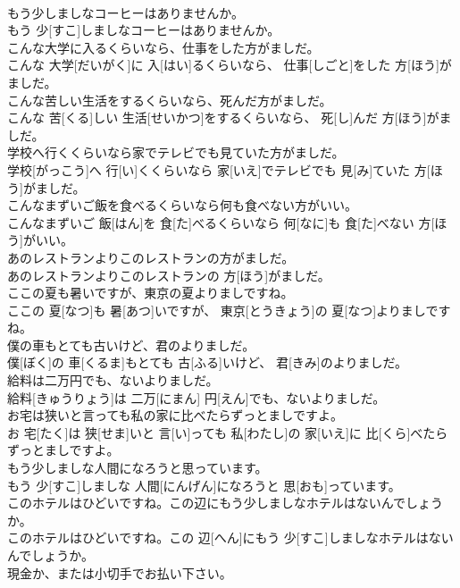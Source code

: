 \documentclass[8pt]{extreport}
\begin{document}
\begin{CJK}{UTF8}{min}
\\	もう少しましなコーヒーはありませんか。	
\\	もう 少[すこ]しましなコーヒーはありませんか。
\\	こんな大学に入るくらいなら、仕事をした方がましだ。	
\\	こんな 大学[だいがく]に 入[はい]るくらいなら、 仕事[しごと]をした 方[ほう]がましだ。
\\	こんな苦しい生活をするくらいなら、死んだ方がましだ。	
\\	こんな 苦[くる]しい 生活[せいかつ]をするくらいなら、 死[し]んだ 方[ほう]がましだ。
\\	学校へ行くくらいなら家でテレビでも見ていた方がましだ。	
\\	学校[がっこう]へ 行[い]くくらいなら 家[いえ]でテレビでも 見[み]ていた 方[ほう]がましだ。
\\	こんなまずいご飯を食べるくらいなら何も食べない方がいい。	
\\	こんなまずいご 飯[はん]を 食[た]べるくらいなら 何[なに]も 食[た]べない 方[ほう]がいい。
\\	あのレストランよりこのレストランの方がましだ。	
\\	あのレストランよりこのレストランの 方[ほう]がましだ。
\\	ここの夏も暑いですが、東京の夏よりましですね。	
\\	ここの 夏[なつ]も 暑[あつ]いですが、 東京[とうきょう]の 夏[なつ]よりましですね。
\\	僕の車もとても古いけど、君のよりましだ。	
\\	僕[ぼく]の 車[くるま]もとても 古[ふる]いけど、 君[きみ]のよりましだ。
\\	給料は二万円でも、ないよりましだ。	
\\	給料[きゅうりょう]は 二万[にまん] 円[えん]でも、ないよりましだ。
\\	お宅は狭いと言っても私の家に比べたらずっとましですよ。	
\\	お 宅[たく]は 狭[せま]いと 言[い]っても 私[わたし]の 家[いえ]に 比[くら]べたらずっとましですよ。
\\	もう少しましな人間になろうと思っています。	
\\	もう 少[すこ]しましな 人間[にんげん]になろうと 思[おも]っています。
\\	このホテルはひどいですね。この辺にもう少しましなホテルはないんでしょうか。	
\\	このホテルはひどいですね。この 辺[へん]にもう 少[すこ]しましなホテルはないんでしょうか。
\\	現金か、または小切手でお払い下さい。	

\end{CJK}
\end{document}
